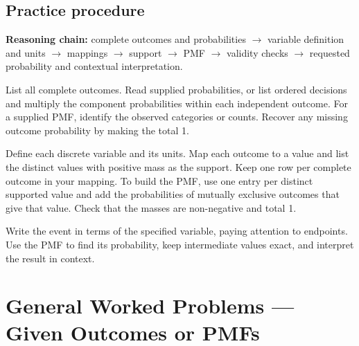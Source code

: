 
\subsection{Practice procedure}
\label{subsec:t2-c1-practice-procedure}

\textbf{Reasoning chain:} complete outcomes and probabilities $\to$ variable definition and units $\to$ mappings $\to$ support $\to$ PMF $\to$ validity checks $\to$ requested probability and contextual interpretation.

\noindent{} List all complete outcomes. Read supplied probabilities, or list ordered decisions and multiply the component probabilities within each independent outcome. For a supplied PMF, identify the observed categories or counts. Recover any missing outcome probability by making the total 1.

\noindent{} Define each discrete variable and its units. Map each outcome to a value and list the distinct values with positive mass as the support. Keep one row per complete outcome in your mapping. To build the PMF, use one entry per distinct supported value and add the probabilities of mutually exclusive outcomes that give that value. Check that the masses are non-negative and total 1.

\noindent{} Write the event in terms of the specified variable, paying attention to endpoints. Use the PMF to find its probability, keep intermediate values exact, and interpret the result in context.


\section{General Worked Problems --- Given Outcomes or PMFs}\label{sec:t2-c1-given-outcomes-or-pmfs}

 \vspace{5mm}

